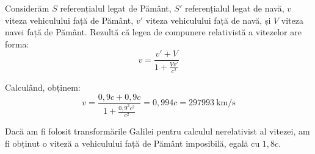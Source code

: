 \parbreak

Considerăm $S$ referențialul legat de Pământ, $S'$ referențialul legat de navă,
$v$ viteza vehiculului față de Pământ, $v'$ viteza vehiculului față de navă, și
$V$ viteza navei față de Pământ. Rezultă că legea de compunere relativistă a
vitezelor are forma:
\[ v = \frac{v' + V}{1 + \frac{Vv'}{c^2}} \]

Calculând, obținem:
\[ v = \frac{0,9c + 0,9c}{1 + \frac{0,9^2 c^2}{c^2}} = 0,994c = 297993 ~ \mathrm{km/s} \]

Dacă am fi folosit transformările Galilei pentru calculul nerelativist al
vitezei, am fi obținut o viteză a vehiculului față de Pământ imposibilă, egală
cu $1,8c$.

